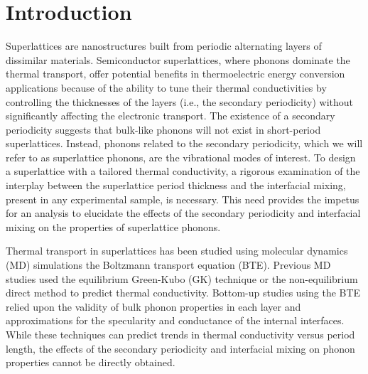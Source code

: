 \documentclass[aps,prb,preprint,preprintnumbers,amsmath,amssymb,floatfix,superscriptaddress]{revtex4}
\begin{document}
\section{Introduction}

Superlattices are nanostructures built from periodic alternating layers of dissimilar materials. Semiconductor superlattices, where phonons dominate the thermal transport, offer potential benefits in thermoelectric energy conversion applications because of the ability to tune their thermal conductivities by controlling the thicknesses of the layers (i.e., the secondary periodicity) without significantly affecting the electronic transport.\cite{broido1995effect,balandin2003mechanism,kim2006thermal} The existence of a secondary periodicity suggests that bulk-like phonons will not exist in short-period superlattices. Instead, phonons related to the secondary periodicity, which we will refer to as superlattice phonons, are the vibrational modes of interest. To design a superlattice with a tailored thermal conductivity, a rigorous examination of the interplay between the superlattice period thickness and the interfacial mixing, present in any experimental sample, is necessary. This need provides the impetus for an analysis to elucidate the effects of the secondary periodicity and interfacial mixing on the properties of superlattice phonons. 

Thermal transport in superlattices has been studied using molecular dynamics (MD) simulations the Boltzmann transport equation (BTE). Previous MD studies used the equilibrium Green-Kubo (GK) \cite {PhysRevB.85.195302,PhysRevB.77.184302} technique or the non-equilibrium \cite{PhysRevB.77.184302,PhysRevB.79.214307,PhysRevB.72.174302,PhysRevB.79.075316} direct method to predict thermal conductivity. Bottom-up studies using the BTE relied upon the validity of bulk phonon properties in each layer\cite{walkauskas:2579,chen:220} and approximations for the specularity and conductance of the internal interfaces.\cite{PhysRevB.57.14958} While these techniques can predict trends in thermal conductivity versus period length, the effects of the secondary periodicity and interfacial mixing on phonon properties cannot be directly obtained.
\end{document}
